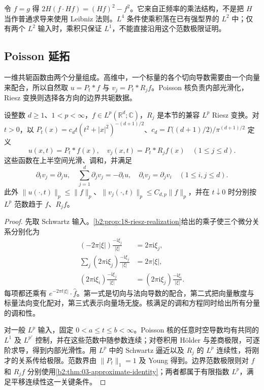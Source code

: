 令 \(f=g\) 得 \(2H(f\cdot Hf)=(Hf)^2-f^2\)。它来自正频率的乘法结构，不是把 \(H\) 当作普通求导来使用 Leibniz 法则。\(L^4\) 条件使乘积落在已有强型界的 \(L^2\) 中；仅有两个 \(L^2\) 输入时，乘积只保证 \(L^1\)，不能直接沿用这个范数极限证明。

\subsection{Poisson 延拓}
\label{b2:subsec:180503}

一维共轭函数由两个分量组成。高维中，一个标量的各个切向导数需要由一个向量来配合，所以自然取 \(u=P_t*f\) 与 \(v_j=P_t*R_jf\)。Poisson 核负责内部光滑化，Riesz 变换则选择各方向的边界共轭数据。

\begin{proposition}\label{b2:prop:18-poisson-conjugacy}
设整数 \(d\geq1\)、\(1<p<\infty\)，\(f\in L^p(\mathbb R^d;\mathbb C)\)，\(R_j\) 是本节的兼容 \(L^p\) Riesz 变换。对 \(t>0\)，以
\(P_t(x)=c_dt(t^2+|x|^2)^{-(d+1)/2}\)、\(c_d=\Gamma\bigl((d+1)/2\bigr)/\pi^{(d+1)/2}\) 定义
\[
 u(x,t)=P_t*f(x),\quad v_j(x,t)=P_t*R_jf(x)\quad(1\leq j\leq d).
\]
这些函数在上半空间光滑、调和，并满足
\[
 \partial_tv_j=\partial_ju,\quad
 \sum_{j=1}^d\partial_jv_j=-\partial_tu,\quad
 \partial_iv_j=\partial_jv_i\quad(1\leq i,j\leq d).
\]
此外 \(\|u(\cdot,t)\|_p\leq\|f\|_p\)、\(\|v_j(\cdot,t)\|_p\leq C_{d,p}\|f\|_p\)，并在 \(t\downarrow0\) 时分别按 \(L^p\) 范数趋于 \(f\)、\(R_jf\)。
\end{proposition}
\begin{proof}
先取 Schwartz 输入。\cref{b2:prop:18-riesz-realization}给出的乘子使三个微分关系分别化为
\[
 \begin{aligned}
 (-2\pi|\xi|)\frac{-\mathrm i\xi_j}{|\xi|}
 &=2\pi\mathrm i\xi_j,\\
 \sum_j(2\pi\mathrm i\xi_j)\frac{-\mathrm i\xi_j}{|\xi|}
 &=2\pi|\xi|,\\
 (2\pi\mathrm i\xi_i)\frac{-\mathrm i\xi_j}{|\xi|}
 &=(2\pi\mathrm i\xi_j)\frac{-\mathrm i\xi_i}{|\xi|}.
 \end{aligned}
\]
每项都还乘有 \(e^{-2\pi t|\xi|}\cdot\widehat f\)。第一式是切向与法向导数的配合，第二式把向量散度与标量法向变化配对，第三式表示向量场无旋。核满足的调和方程同时给出所有分量的调和性。

对一般 \(L^p\) 输入，固定 \(0<a\leq t\leq b<\infty\)。Poisson 核的任意时空导数均有共同的 \(L^1\) 及 \(L^{p'}\) 控制，并在这些范数中随参数连续；对卷积用 Hölder 与差商极限，可逐阶求导，得到内部光滑性。用 \(L^p\) 中的 Schwartz 逼近以及 \(R_j\) 的 \(L^p\) 连续性，将刚才的关系传给极限。范数界由 \(\|P_t\|_1=1\) 及 Young 得到。边界范数极限则对 \(f\) 和 \(R_jf\) 分别使用\cref{b2:thm:03-approximate-identity}；两者都属于有限指数 \(L^p\)，满足平移连续性这一关键条件。
\end{proof}

